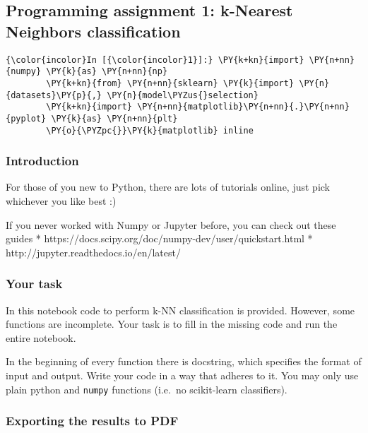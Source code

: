   
    \hypertarget{programming-assignment-1-k-nearest-neighbors-classification}{%
\subsection{Programming assignment 1: k-Nearest Neighbors
classification}\label{programming-assignment-1-k-nearest-neighbors-classification}}

    \begin{Verbatim}[commandchars=\\\{\}]
{\color{incolor}In [{\color{incolor}1}]:} \PY{k+kn}{import} \PY{n+nn}{numpy} \PY{k}{as} \PY{n+nn}{np}
        \PY{k+kn}{from} \PY{n+nn}{sklearn} \PY{k}{import} \PY{n}{datasets}\PY{p}{,} \PY{n}{model\PYZus{}selection}
        \PY{k+kn}{import} \PY{n+nn}{matplotlib}\PY{n+nn}{.}\PY{n+nn}{pyplot} \PY{k}{as} \PY{n+nn}{plt}
        \PY{o}{\PYZpc{}}\PY{k}{matplotlib} inline  
\end{Verbatim}

    \hypertarget{introduction}{%
\subsubsection{Introduction}\label{introduction}}

For those of you new to Python, there are lots of tutorials online, just
pick whichever you like best :)

If you never worked with Numpy or Jupyter before, you can check out
these guides * https://docs.scipy.org/doc/numpy-dev/user/quickstart.html
* http://jupyter.readthedocs.io/en/latest/

    \hypertarget{your-task}{%
\subsubsection{Your task}\label{your-task}}

In this notebook code to perform k-NN classification is provided.
However, some functions are incomplete. Your task is to fill in the
missing code and run the entire notebook.

In the beginning of every function there is docstring, which specifies
the format of input and output. Write your code in a way that adheres to
it. You may only use plain python and \texttt{numpy} functions (i.e.~no
scikit-learn classifiers).

    \hypertarget{exporting-the-results-to-pdf}{%
\subsubsection{Exporting the results to
PDF}\label{exporting-the-results-to-pdf}}

